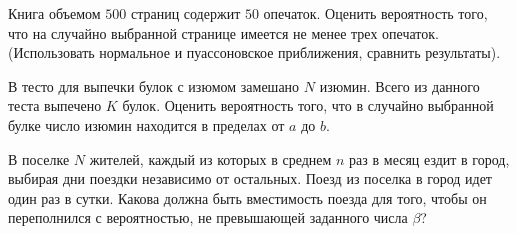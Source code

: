 \begin{problem}
Книга объемом $500$ страниц содержит $50$ опечаток. Оценить вероятность того, что на случайно выбранной странице 
имеется не менее трех опечаток. (Использовать нормальное и пуассоновское приближения, сравнить результаты). 
\end{problem}

\begin{problem}
В тесто для выпечки булок с изюмом замешано $N$ изюмин. Всего из данного теста выпечено $K$ булок. Оценить вероятность того, 
что в случайно выбранной булке число изюмин находится в пределах от $a$ до $b$. 
\end{problem}

\begin{problem}
В поселке $N$ жителей, каждый из которых в среднем $n$ раз в месяц ездит в город, выбирая дни поездки независимо от остальных. 
Поезд из поселка в город идет один раз в сутки. Какова должна быть вместимость поезда для того, чтобы он переполнился с вероятностью, 
не превышающей заданного числа $\beta$? 
\end{problem}

